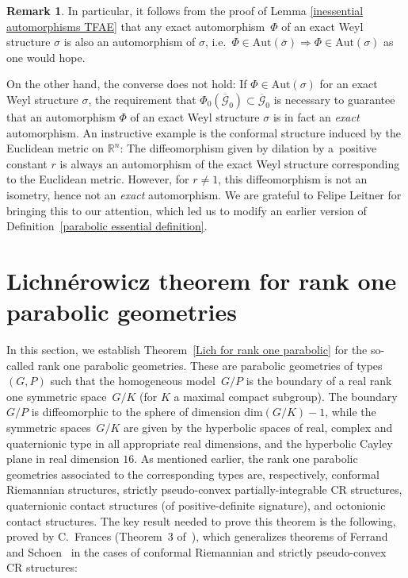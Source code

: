 \documentclass[pdftex]{sigma}
\def\R{\mathbb{R}}
\def\Gbdle{\mathcal{G}}
\theoremstyle{plain}
\theoremstyle{definition}
\newtheorem{Remark}[Definition]{Remark}
\begin{document}
\begin{Remark} In particular, it follows from the proof of Lemma \ref{inessential automorphisms TFAE} that any exact automor\-phism~$\Phi$ of an exact Weyl structure $\sigma$ is also an automorphism of $\sigma$, i.e.\ $\Phi \in \mathrm{Aut}(\overline{\sigma}) \Rightarrow \Phi \in \mathrm{Aut}(\sigma)$ as one would hope.

 On the other hand, the converse does not hold: If $\Phi \in \mathrm{Aut}(\sigma)$ for an exact Weyl structure $\sigma$, the requirement that $\Phi_0(\overline{\Gbdle}_0) \subset \overline{\Gbdle}_0$ is necessary to guarantee that an automorphism $\Phi$ of an exact Weyl structure $\sigma$ is in fact an \emph{exact} automorphism. An instructive example is the conformal structure induced by the Euclidean metric on $\R^n$: The dif\/feomorphism given by dilation by a~positive constant $r$ is always an automorphism of the exact Weyl structure corresponding to the Euclidean metric. However, for $r \neq 1$, this dif\/feomorphism is not an isometry, hence not an \emph{exact} automorphism. We are grateful to Felipe Leitner for bringing this to our attention, which led us to modify an earlier version of Def\/inition~\ref{parabolic essential definition}.
\end{Remark}

\section{Lichn\'{e}rowicz theorem for rank one parabolic geometries}\label{section3}

In this section, we establish Theorem~\ref{Lich for rank one parabolic} for the so-called rank one parabolic geometries. These are parabolic geometries of types~$(G,P)$ such that the homogeneous model~$G/P$ is the bounda\-ry of a real rank one symmetric space~$G/K$ (for $K$ a maximal compact subgroup). The boundary~$G/P$ is dif\/feomorphic to the sphere of dimension $\mathrm{dim}(G/K)-1$, while the symmetric spaces~$G/K$ are given by the hyperbolic spaces of real, complex and quaternionic type in all appropriate real dimensions, and the hyperbolic Cayley plane in real dimension $16$. As mentioned earlier, the rank one parabolic geometries associated to the corresponding types are, respectively, conformal Riemannian structures, strictly pseudo-convex partially-integrable CR structures, quaternionic contact structures (of positive-def\/inite signature), and octonionic contact structures. The key result needed to prove this theorem is the following, proved by C.~Frances (Theorem~3 of~\cite{Frances}), which generalizes theorems of Ferrand~\cite{Ferrand} and Schoen~\cite{Schoen} in the cases of conformal Riemannian and strictly pseudo-convex CR structures:
\end{document}
